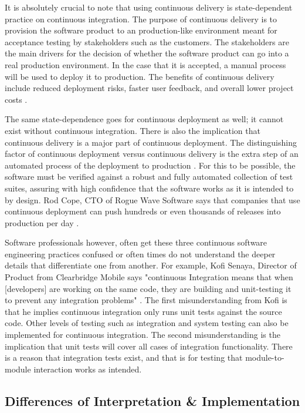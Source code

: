 \documentclass[12pt,a4paper]{article}
\begin{document}
It is absolutely crucial to note that using continuous delivery is state-dependent practice on continuous integration. The purpose of continuous delivery is to provision the software product to an production-like environment meant for acceptance testing by stakeholders such as the customers. The stakeholders are the main drivers for the decision of whether the software product can go into a real production environment. In the case that it is accepted, a manual process will be used to deploy it to production. The benefits of continuous delivery include reduced deployment risks, faster user feedback, and overall lower project costs \cite[p. ~3910-3911]{shahin_babar_zhu_2017}.

The same state-dependence goes for continuous deployment as well; it cannot exist without continuous integration. There is also the implication that continuous delivery is a major part of continuous deployment. The distinguishing factor of continuous deployment versus continuous delivery is the extra step of an automated process of the deployment to production \cite[p. ~3911]{shahin_babar_zhu_2017}. For this to be possible, the software must be verified against a robust and fully automated collection of test suites, assuring with high confidence that the software works as it is intended to by design. Rod Cope, CTO of Rogue Wave Software says that companies that use continuous deployment can push hundreds or even thousands of releases into production per day \cite{stackify_2018}.

Software professionals however, often get these three continuous software engineering practices confused or often times do not understand the deeper details that differentiate one from another. For example, Kofi Senaya, Director of Product from Clearbridge Mobile says "continuous Integration means that when [developers] are working on the same code, they are building and unit-testing it to prevent any integration problems" \cite{stackify_2018}. The first misunderstanding from Kofi is that he implies continuous integration only runs unit tests against the source code. Other levels of testing such as integration and system testing can also be implemented for continuous integration. The second misunderstanding is the implication that unit tests will cover all cases of integration functionality. There is a reason that integration tests exist, and that is for testing that module-to-module interaction works as intended.
		
	\subsection{Differences of Interpretation \& Implementation}
\end{document}
